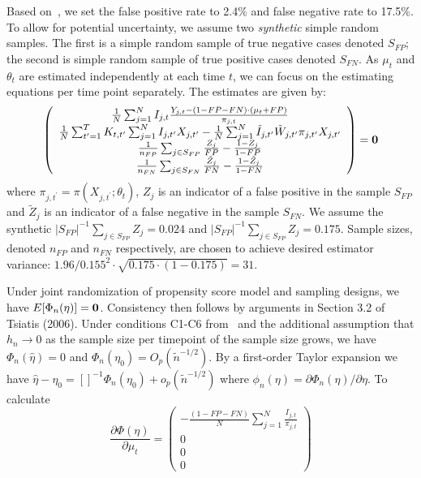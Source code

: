 \documentclass[12pt]{amsart}
\numberwithin{equation}{section}
\theoremstyle{plain}
\begin{document}

Based on~\cite{Woloshin2020}, we set the false positive rate to 2.4\% and false negative rate to 17.5\%.  To allow for potential uncertainty, we assume two \emph{synthetic} simple random samples.  The first is a simple random sample of true negative cases denoted $S_{FP}$; the second is simple random sample of true positive cases denoted $S_{FN}$.  As $\mu_t$ and $\theta_{t}$ are estimated independently at each time $t$, we can focus on the estimating equations per time point separately.  The estimates are given by:
$$
\left (
\begin{array}{c}
\frac{1}{N} \sum_{j=1}^N I_{j,t} \frac{Y_{j,t} - (1-FP-FN) \cdot (\mu_t+FP)}{\pi_{j,t}} \\
\frac{1}{N} \sum_{t^\prime = 1}^T K_{t,t^\prime} \sum_{j=1}^N I_{j,t^\prime} X_{j,t^\prime} - \frac{1}{N} \sum_{j = 1}^N \tilde I_{j,t^\prime} \tilde W_{j,t^\prime}  \pi_{j,t^\prime} X_{j,t^\prime}  \\
\frac{1}{n_{FP}} \sum_{j \in S_{FP}} \frac{Z_j}{FP} - \frac{1-Z_j}{1-FP} \\
\frac{1}{n_{FN}} \sum_{j \in S_{FN}} \frac{\tilde Z_j}{FN} - \frac{1-\tilde Z_j}{1-FN} \\
\end{array}
\right ) = {\bf 0}
$$
where $\pi_{j,t^\prime} = \pi (X_{j,t^\prime}; \theta_t)$, $Z_j$ is an indicator of a false positive in the sample $S_{FP}$  and $\tilde Z_j$ is an indicator of a false negative in the sample $S_{FN}$.  We assume the synthetic $|S_{FP}|^{-1} \sum_{j \in S_{FP}} Z_j = 0.024$ and $|S_{FP}|^{-1} \sum_{j \in S_{FP}} Z_j = 0.175$.  Sample sizes, denoted $n_{FP}$ and $n_{FN}$ respectively, are chosen to achieve desired estimator variance: $1.96/0.155^2 \cdot \sqrt{0.175 \cdot (1-0.175)} = 31$.

Under joint randomization of propensity score model and sampling designs, we have $E [ \Phi_n (\eta) ] = {\bf 0}$.  Consistency then follows by arguments in Section 3.2 of Tsiatis (2006). Under conditions C1-C6 from~\cite{Chen2019} and the additional assumption that $h_n \to 0$ as the sample size per timepoint of the sample size grows, we have $\Phi_n (\hat \eta) = 0$ and $\Phi_n (\eta_0) = O_p ( \tilde n^{-1/2} )$.  By a first-order Taylor expansion we have $\hat \eta - \eta_0 = \left[ \right]^{-1} \Phi_n(\eta_0) + o_p (\tilde n^{-1/2})$ where $\phi_n(\eta) = \partial \Phi_n (\eta)/\partial \eta$.  To calculate
$$
\frac{\partial \Phi (\eta)}{\partial \mu_t} =
\left (
\begin{array}{c}
-\frac{(1-FP-FN)}{N} \sum_{j=1}^N \frac{I_{j,t}}{\pi_{j,t}} \\
0 \\
0 \\
0
\end{array}
\right )
$$
\end{document}
